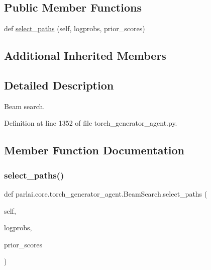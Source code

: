 \subsection*{Public Member Functions}
\begin{DoxyCompactItemize}
\item 
def \hyperlink{classparlai_1_1core_1_1torch__generator__agent_1_1BeamSearch_a3d67c12c987514ad263418ca2d98bbba}{select\+\_\+paths} (self, logprobs, prior\+\_\+scores)
\end{DoxyCompactItemize}
\subsection*{Additional Inherited Members}


\subsection{Detailed Description}
\begin{DoxyVerb}Beam search.
\end{DoxyVerb}
 

Definition at line 1352 of file torch\+\_\+generator\+\_\+agent.\+py.



\subsection{Member Function Documentation}
\mbox{\label{classparlai_1_1core_1_1torch__generator__agent_1_1BeamSearch_a3d67c12c987514ad263418ca2d98bbba}} 
\subsubsection{\texorpdfstring{select\+\_\+paths()}{select\_paths()}}
{\footnotesize\ttfamily def parlai.\+core.\+torch\+\_\+generator\+\_\+agent.\+Beam\+Search.\+select\+\_\+paths (\begin{DoxyParamCaption}\item[{}]{self,  }\item[{}]{logprobs,  }\item[{}]{prior\+\_\+scores }\end{DoxyParamCaption})}

